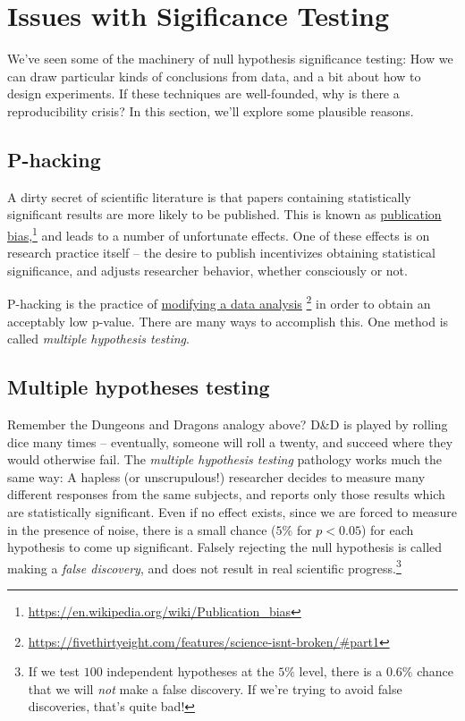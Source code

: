 \documentclass{tufte-handout}
\begin{document}
\section{Issues with Sigificance Testing}
\label{sec:org67dae6b}
We've seen some of the machinery of null hypothesis significance testing: How we
can draw particular kinds of conclusions from data, and a bit about how to
design experiments. If these techniques are well-founded, why is there a
reproducibility crisis? In this section, we'll explore some plausible reasons.

\subsection{P-hacking}
\label{sec:org642b5c9}
A dirty secret of scientific literature is that papers containing statistically
significant results are more likely to be published. This is known as
\href{https://en.wikipedia.org/wiki/Publication\_bias}{publication bias},\footnote{\url{https://en.wikipedia.org/wiki/Publication\_bias}} and leads
to a number of unfortunate effects. One of these effects is on research practice
itself -- the desire to publish incentivizes obtaining statistical significance,
and adjusts researcher behavior, whether consciously or not.

P-hacking is the practice of \href{https://fivethirtyeight.com/features/science-isnt-broken/\#part1}{modifying a data analysis}
\footnote{\url{https://fivethirtyeight.com/features/science-isnt-broken/\#part1}} in order
to obtain an acceptably low p-value. There are many ways to accomplish this. One
method is called \emph{multiple hypothesis testing}.

\subsection{Multiple hypotheses testing}
\label{sec:org298a165}
Remember the Dungeons and Dragons analogy above? D\&D is played by rolling dice
many times -- eventually, someone will roll a twenty, and succeed where they
would otherwise fail. The \emph{multiple hypothesis testing} pathology works much the
same way: A hapless (or unscrupulous!) researcher decides to measure many
different responses from the same subjects, and reports only those results which
are statistically significant. Even if no effect exists, since we are forced to
measure in the presence of noise, there is a small chance (\(5\%\) for \(p<0.05\))
for each hypothesis to come up significant. Falsely rejecting the null
hypothesis is called making a \emph{false discovery}, and does not result in real
scientific progress.\footnote{If we test \(100\) independent hypotheses at the \(5\%\)
level, there is a \(0.6\%\) chance that we will \emph{not} make a false discovery. If
we're trying to avoid false discoveries, that's quite bad!}
\end{document}
